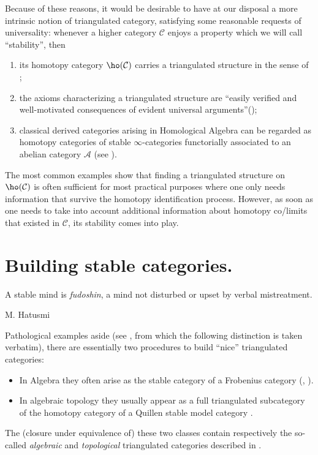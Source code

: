 \documentclass[11pt, a4paper]{amsart}
\renewcommand{\C}{\mathcal{C}}
\renewcommand{\A}{\mathcal{A}}
\begin{document}
Because of these reasons, it would be desirable to have at our disposal a more intrinsic notion of triangulated category, satisfying some reasonable requests of universality: whenever a higher category $\C$ enjoys a property which we will call ``stability'', then
\begin{enumerate}[label=\smallcap{sc}\oldstylenums{\arabic*})]
\item \label{fst.sc} its homotopy category $\ho(\C)$ carries a triangulated structure in the sense of \adef {};
\item the axioms characterizing a triangulated structure are ``easily verified and well-motivated consequences of evident universal arguments''(\cite[Remark \textbf{1.1.2.16}]{LurieHA});
\item \label{last.sc} classical derived categories arising in Homological Algebra can be regarded as homotopy categories of stable $\infty$-categories functorially associated to an abelian category $\A$ (see \cite[\S \textbf{1.3.1}]{LurieHA}).
\end{enumerate}
The most common examples show that finding a triangulated structure on $\ho(\C)$ is often sufficient for most practical purposes where one only needs information that survive the homotopy identification process. However, as soon as one needs to take into account additional information about homotopy co\fshyp{}limits that existed in $\C$, its stability comes into play.
\section{Building stable categories.}\label{buildingstab}
\epigraph{A stable mind is \emph{fudoshin}, a mind not disturbed or upset by verbal mistreatment.}{M\@. Hatusmi}
Pathological examples aside (see \cite{FMS}, from which the following distinction is taken verbatim), there are essentially two procedures to build ``nice'' triangulated categories:
\begin{itemize}
\item In Algebra they often arise as the stable category of a Frobenius category (\cite[\textbf{4.4}]{shc}, \cite[\textbf{IV.3} Exercise \textbf{8}]{gelfand2013methods}).
\item In algebraic topology they usually appear as a full triangulated subcategory of the homotopy category of a Quillen stable model category \cite[\textbf{7.1}]{Hov}.
\end{itemize}

The (closure under equivalence of) these two classes contain respectively the so-called \emph{algebraic} and \emph{topological} triangulated categories described in \cite{Schwede2010}.
\end{document}
